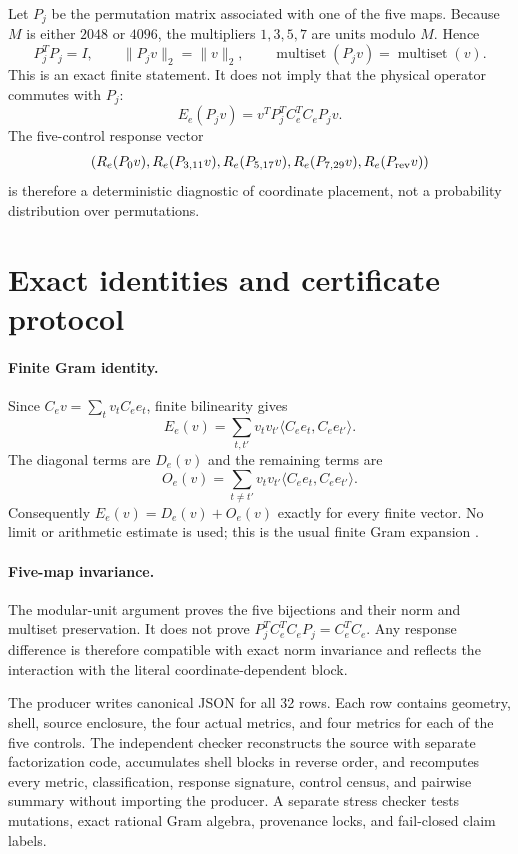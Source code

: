 \documentclass[10pt]{article}
\begin{document}
Let $P_j$ be the permutation matrix associated with one of the five maps.
Because $M$ is either $2048$ or $4096$, the multipliers $1,3,5,7$ are units
modulo $M$.  Hence
\[
 P_j^{T}P_j=I,\qquad
 \|P_jv\|_2=\|v\|_2,\qquad
 \operatorname{multiset}(P_jv)=\operatorname{multiset}(v).
\]
This is an exact finite statement.  It does not imply that the physical
operator commutes with $P_j$:
\[
 E_e(P_jv)=v^TP_j^TC_e^TC_eP_jv.
\]
The five-control response vector
\[
 \left(R_e(P_0v),R_e(P_{3,11}v),R_e(P_{5,17}v),
       R_e(P_{7,29}v),R_e(P_{\rm rev}v)\right)
\]
is therefore a deterministic diagnostic of coordinate placement, not a
probability distribution over permutations.

\section{Exact identities and certificate protocol}

\paragraph{Finite Gram identity.}
Since $C_ev=\sum_t v_tC_ee_t$, finite bilinearity gives
\[
 E_e(v)=\sum_{t,t'}v_tv_{t'}
       \langle C_ee_t,C_ee_{t'}\rangle.
\]
The diagonal terms are $D_e(v)$ and the remaining terms are
\[
 O_e(v)=\sum_{t\ne t'}v_tv_{t'}
       \langle C_ee_t,C_ee_{t'}\rangle.
\]
Consequently $E_e(v)=D_e(v)+O_e(v)$ exactly for every finite vector.  No
limit or arithmetic estimate is used; this is the usual finite Gram expansion
\cite{horn2013matrix}.

\paragraph{Five-map invariance.}
The modular-unit argument proves the five bijections and their norm and
multiset preservation.  It does not prove
$P_j^TC_e^TC_eP_j=C_e^TC_e$.  Any response difference is therefore compatible
with exact norm invariance and reflects the interaction with the literal
coordinate-dependent block.

The producer writes canonical JSON for all 32 rows.  Each row contains
geometry, shell, source enclosure, the four actual metrics, and four metrics
for each of the five controls.  The independent checker reconstructs the
source with separate factorization code, accumulates shell blocks in reverse
order, and recomputes every metric, classification, response signature,
control census, and pairwise summary without importing the producer.  A
separate stress checker tests mutations, exact rational Gram algebra,
provenance locks, and fail-closed claim labels.
\end{document}
